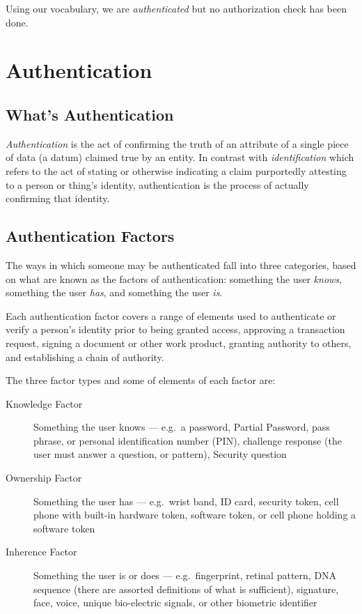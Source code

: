 \documentclass[11pt]{report}
\begin{document}
Using our vocabulary, we are \emph{authenticated} but no authorization
check has been done.


\chapter{Authentication}

\section{What's Authentication}

\emph{Authentication} is the act of confirming the truth of an attribute
of a single piece of data (a datum) claimed true by an entity. In
contrast with \emph{identification} which refers to the act of stating
or otherwise indicating a claim purportedly attesting to a person or
thing's identity, authentication is the process of actually confirming
that identity.


\section{Authentication Factors}

The ways in which someone may be authenticated fall into three
categories, based on what are known as the factors of authentication:
something the user \emph{knows}, something the user \emph{has}, and
something the user \emph{is}.

Each authentication factor covers a range of elements used to
authenticate or verify a person's identity prior to being granted
access, approving a transaction request, signing a document or other
work product, granting authority to others, and establishing a chain of
authority.


The three factor types and some of elements of each factor are:

\begin{description}

    \item[Knowledge Factor] Something the user knows --- e.g.\ a 
        password, Partial Password, pass phrase, or personal identification 
        number (PIN), challenge response (the user must answer a question, 
        or pattern), Security question

    \item[Ownership Factor] Something the user has --- e.g.\ wrist band, 
        ID card, security token, cell phone with built-in hardware token, 
        software token, or cell phone holding a software token

    \item[Inherence Factor] Something the user is or does --- e.g.\ 
        fingerprint, retinal pattern, DNA sequence (there are assorted 
        definitions of what is sufficient), signature, face, voice, 
        unique bio-electric signals, or other biometric identifier

\end{description}
\end{document}
